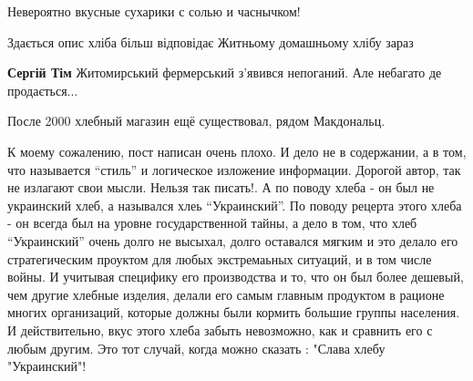 \begin{itemize}
Невероятно вкусные сухарики с солью и часнычком!

Здається опис хліба більш відповідає Житньому домашньому хлібу зараз

\begin{itemize} %
\textbf{Сергій Тім} Житомирський фермерський з'явився непоганий. Але небагато де продається...
\end{itemize} %

После 2000 хлебный магазин ещё существовал, рядом Макдональц.


К моему сожалению, пост написан очень плохо. И дело не в содержании, а в том,
что называется \enquote{стиль} и логическое изложение информации. Дорогой автор, так не
излагают свои мысли. Нельзя так писать!. А по поводу хлеба - он был не
украинский хлеб, а назывался хлеь \enquote{Украинский}. По поводу рецерта этого хлеба -
он всегда был на уровне государственной тайны, а дело в том, что хлеб
\enquote{Украинский} очень долго не высыхал, долго оставался мягким и это делало его
стратегическим проуктом для любых экстремаьных ситуаций, и в том числе войны. И
учитывая специфику его производства и то, что он был более дешевый, чем другие
хлебные изделия, делали его самым главным продуктом в рационе многих
организаций, которые должны были кормить большие группы населения. И
действительно, вкус этого хлеба забыть невозможно, как и сравнить его с любым
другим. Это тот случай, когда можно сказать : "Слава хлебу "Украинский"!


\end{itemize} %
